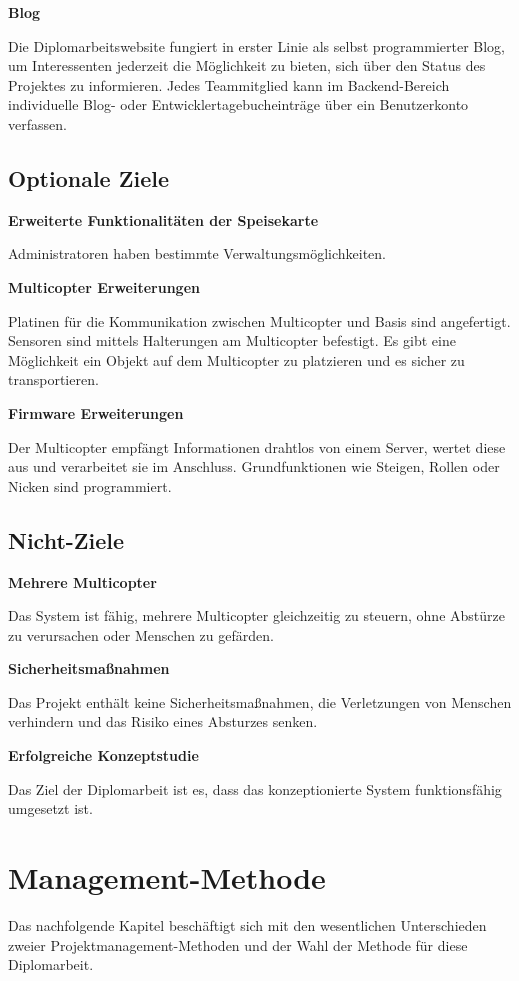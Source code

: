   \textbf{Blog}

  Die Diplomarbeitswebsite fungiert in erster Linie als selbst programmierter Blog, um Interessenten
  jederzeit die Möglichkeit zu bieten, sich über den Status des Projektes zu informieren. Jedes Teammitglied
  kann im Backend-Bereich individuelle Blog- oder Entwicklertagebucheinträge über ein Benutzerkonto verfassen.

  \subsection{Optionale Ziele}
  \textbf{Erweiterte Funktionalitäten der Speisekarte}

  Administratoren haben bestimmte Verwaltungsmöglichkeiten.

  \textbf{Multicopter Erweiterungen}

  Platinen für die Kommunikation zwischen Multicopter und Basis sind angefertigt.
  Sensoren sind mittels Halterungen am Multicopter befestigt.
  Es gibt eine Möglichkeit ein Objekt auf dem Multicopter zu platzieren und es sicher zu transportieren.

  \textbf{Firmware Erweiterungen}

  Der Multicopter empfängt Informationen drahtlos von einem Server,
  wertet diese aus und verarbeitet sie im Anschluss.
  Grundfunktionen wie Steigen, Rollen oder Nicken sind programmiert.

  \subsection{Nicht-Ziele}
  \textbf{Mehrere Multicopter}

  Das System ist fähig, mehrere Multicopter gleichzeitig zu steuern, ohne Abstürze
  zu verursachen oder Menschen zu gefärden.

  \textbf{Sicherheitsmaßnahmen}

  Das Projekt enthält keine Sicherheitsmaßnahmen, die Verletzungen von Menschen
  verhindern und das Risiko eines Absturzes senken.

  \textbf{Erfolgreiche Konzeptstudie}

  Das Ziel der Diplomarbeit ist es, dass das konzeptionierte System
  funktionsfähig umgesetzt ist.

\section{Management-Methode}
Das nachfolgende Kapitel beschäftigt sich mit den wesentlichen Unterschieden
zweier Projektmanagement-Methoden und der Wahl der Methode für diese Diplomarbeit.

